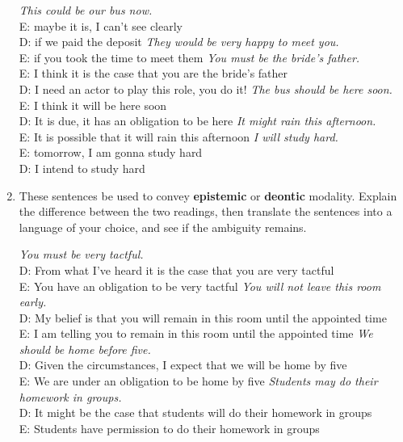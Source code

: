\documentclass[a4paper]{article}
\newcommand{\eng}[1]{\textit{#1}}
\begin{document}
\begin{enumerate}
  \begin{exe}
    \ex \eng{This could be our bus now.}
    \\ E: maybe it is, I can't see clearly
    \\ D: if we paid the deposit 
    \ex \eng{They would be very happy to meet you.}
    \\ E: if you took the time to meet them
    \ex \eng{You must be the bride's father.}
    \\ E: I think it is the case that you are the bride's father
    \\ D: I need an actor to play this role, you do it!
    \ex \eng{The bus should be here soon.}
    \\ E: I think it will be here soon
    \\ D: It is due, it has an obligation to be here
    \ex \eng{It might rain this afternoon.}
    \\ E: It is possible that it will rain this afternoon
    \ex \eng{I will study hard.}
    \\ E: tomorrow, I am gonna study hard
    \\ D: I intend to study hard
  \end{exe}
\newpage
\item These sentences be used to convey \textbf{epistemic} or
  \textbf{deontic} modality. Explain the difference between the two
  readings, then translate the sentences into a language of your
  choice, and see if the ambiguity remains.
  \begin{exe}
    \ex \eng{You must be very tactful.}
    \\ D: From what I've heard it is the case that you are very tactful
    \\ E: You have an obligation to be very tactful
    \ex \eng{You will not leave this room early.}
    \\ D: My belief is that you will remain in this room until
      the appointed time
    \\ E: I am telling you to remain in this room until
      the appointed time
    \ex \eng{We should be home before five.}
    \\ D: Given the circumstances, I expect that we will be home by five
    \\ E: We are under an obligation to be home by five
    \ex \eng{Students may do their homework in groups. }
    \\ D: It might be the case that students will do their homework in groups
    \\ E: Students have permission to do their homework in groups
  \end{exe}



\end{enumerate}
\end{document}
